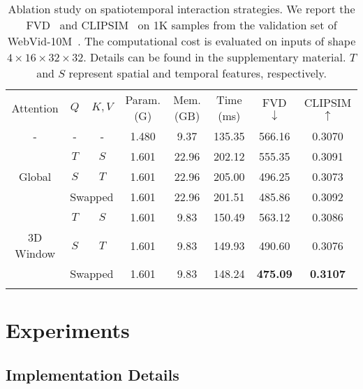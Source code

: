 \documentclass{article}
\begin{document}
\begin{table}[t]
    \centering
    \footnotesize
    \caption{Ablation study on spatiotemporal interaction strategies. We report the FVD~\cite{FVD} and CLIPSIM~\cite{CLIP} on 1K samples from the validation set of WebVid-10M~\cite{bain2021frozen}. The computational cost is evaluated on inputs of shape $4\times16\times32\times32$. Details can be found in the supplementary material. $T$ and $S$ represent spatial and temporal features, respectively.
    }
    \vspace{1mm}
    \renewcommand{\arraystretch}{1.2}
    \begin{tabular}{c|c|c|ccccc}
        \Xhline{1.2pt}
         Attention   & $Q$ & $K,V$ & Param. (G) & Mem. (GB) & Time (ms) &  FVD $\downarrow$ & CLIPSIM $\uparrow$ \\
        \Xhline{0.4pt}
         -                  & -    &   -  & 1.480 & 9.37  & 135.35 & 566.16  & 0.3070 \\ \Xhline{0.4pt}
                            & $T$ & $S$  & 1.601 & 22.96 & 202.12 & 555.35 & 0.3091 \\ Global              & $S$ & $T$  & 1.601 & 22.96 & 205.00 & 496.25 & 0.3073 \\
        \cline{2-8}
                            & \multicolumn{2}{c|}{Swapped}  & 1.601 & 22.96 & 201.51 & 485.86 & 0.3092 \\
           
        \Xhline{0.4pt}
                            & $T$ & $S$  & 1.601 & 9.83 & 150.49 & 563.12 & 0.3086 \\ 3D Window           & $S$ & $T$   & 1.601 & 9.83 & 149.93 & 490.60 & 0.3076 \\
        \cline{2-8}
                            & \multicolumn{2}{c|}{Swapped}  & 1.601 & 9.83 & 148.24 & \textbf{475.09} & \textbf{0.3107} \\
        \Xhline{1.2pt}
    \end{tabular}
    \label{tab:aba_interaction}
\end{table}

\section{Experiments}

\subsection{Implementation Details}
\end{document}
